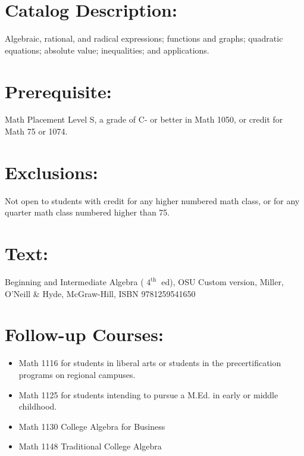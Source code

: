 \documentclass{ximera}
\begin{document}
\section*{Catalog Description:}
Algebraic, rational, and radical expressions; functions and graphs; quadratic equations; absolute value; inequalities; and applications.

\section*{Prerequisite:}
Math Placement Level S, a grade of C- or better in Math 1050, or credit for Math 75 or 1074.

\section*{Exclusions:}
Not open to students with credit for any higher numbered math class, or for any quarter math class numbered higher than 75.

\section*{Text:}
Beginning and Intermediate Algebra ( $4^{\text {th }}$ ed), OSU Custom version, Miller, O'Neill \& Hyde, McGraw-Hill, ISBN 9781259541650

\section*{Follow-up Courses:}
\begin{itemize}
  \item Math 1116 for students in liberal arts or students in the precertification programs on regional campuses.
  \item Math 1125 for students intending to pursue a M.Ed. in early or middle childhood.
  \item Math 1130 College Algebra for Business
  \item Math 1148 Traditional College Algebra
\end{itemize}
\end{document}
